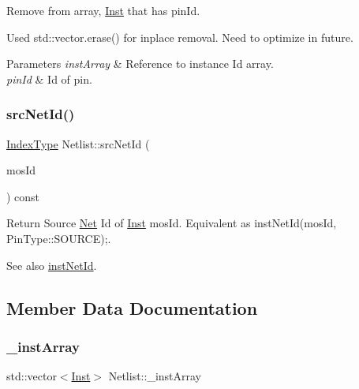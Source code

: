 Remove from array, \hyperlink{classInst}{Inst} that has pin\+Id. 

Used std\+::vector.\+erase() for inplace removal. Need to optimize in future.


\begin{DoxyParams}{Parameters}
{\em inst\+Array} & Reference to instance Id array. \\
\hline
{\em pin\+Id} & Id of pin. \\
\hline
\end{DoxyParams}
\mbox{\label{classNetlist_a306b7d5127774b04081c9bf3b26aebd3}} 
\subsubsection{\texorpdfstring{src\+Net\+Id()}{srcNetId()}}
{\footnotesize\ttfamily \hyperlink{type_8h_a581e8093e28e7362f2b6937296190676}{Index\+Type} Netlist\+::src\+Net\+Id (\begin{DoxyParamCaption}\item[{\hyperlink{type_8h_a581e8093e28e7362f2b6937296190676}{Index\+Type}}]{mos\+Id }\end{DoxyParamCaption}) const\hspace{0.3cm}{\ttfamily [inline]}}



Return Source \hyperlink{classNet}{Net} Id of \hyperlink{classInst}{Inst} mos\+Id. Equivalent as inst\+Net\+Id(mos\+Id, Pin\+Type\+::\+S\+O\+U\+R\+C\+E);. 

\begin{DoxySeeAlso}{See also}
\hyperlink{classNetlist_af7ac6daa5f0f66a60c71b69a1d8fd670}{inst\+Net\+Id}. 
\end{DoxySeeAlso}


\subsection{Member Data Documentation}
\mbox{\label{classNetlist_a301a0c44a335af1bc3af743f645eae9e}} 
\subsubsection{\texorpdfstring{\+\_\+inst\+Array}{\_instArray}}
{\footnotesize\ttfamily std\+::vector$<$\hyperlink{classInst}{Inst}$>$ Netlist\+::\+\_\+inst\+Array\hspace{0.3cm}{\ttfamily [private]}}

